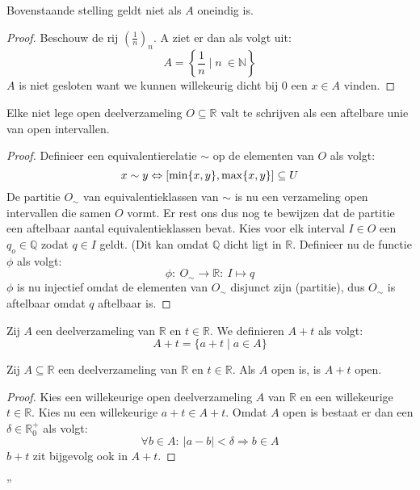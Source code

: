 \documentclass[main.tex]{subfiles}
\begin{document}
\begin{tvb}
  Bovenstaande stelling geldt niet als $A$ oneindig is.

  \begin{proof}
    Beschouw de rij $\left(\frac{1}{n}\right)_{n}$.
    A ziet er dan als volgt uit:
    \[ A = \left\{ \frac{1}{n} \mid n\ \in \mathbb{N} \right\} \]
    $A$ is niet gesloten want we kunnen willekeurig dicht bij $0$ een $x\in A$ vinden.
  \end{proof}
\end{tvb}

\begin{st}
  Elke niet lege open deelverzameling $O \subseteq \mathbb{R}$ valt te schrijven als een aftelbare unie van open intervallen.

  \begin{proof}
    Definieer een equivalentierelatie $\sim$ op de elementen van $O$ als volgt:
    \[ x \sim y \Leftrightarrow \interval{\min\{x,y\}}{\max\{x,y\}} \subseteq U \]
    De partitie $O_{\sim}$ van equivalentieklassen van $\sim$ is nu een verzameling open intervallen die samen $O$ vormt.
    Er rest ons dus nog te bewijzen dat de partitie een aftelbaar aantal equivalentieklassen bevat.
    Kies voor elk interval $I\in O$ een $q_{o}\in \mathbb{Q}$ zodat $q\in I$ geldt.
    (Dit kan omdat $\mathbb{Q}$ dicht ligt in $\mathbb{R}$.
    Definieer nu de functie $\phi$ als volgt:
    \[ \phi:\ O_{\sim} \rightarrow \mathbb{R}:\ I \mapsto q \]
    $\phi$ is nu injectief omdat de elementen van $O_{\sim}$ disjunct zijn (partitie), dus $O_{\sim}$ is aftelbaar omdat $q$ aftelbaar is.
  \end{proof}
\feed
\end{st}


\begin{de}
  Zij $A$ een deelverzameling van $\mathbb{R}$ en $t\in \mathbb{R}$.
  We definieren $A+t$ als volgt:
  \[ A + t = \{ a + t \mid a \in A \} \]
\end{de}

\begin{st}
  Zij $A \subseteq \mathbb{R}$ een deelverzameling van $\mathbb{R}$ en $t\in \mathbb{R}$.
  Als $A$ open is, is $A+t$ open.

  \begin{proof}
    Kies een willekeurige open deelverzameling $A$ van $\mathbb{R}$ en een willekeurige $t\in \mathbb{R}$.
    Kies nu een willekeurige $a+t\in A+t$.
    Omdat $A$ open is bestaat er dan een $\delta \in \mathbb{R}_{0}^{+}$ als volgt:
    \[ \forall b \in A:\ |a-b| < \delta \Rightarrow b\in A \]
    $b+t$ zit bijgevolg ook in $A+t$.
  \end{proof}
\feed''
\end{st}
\end{document}
